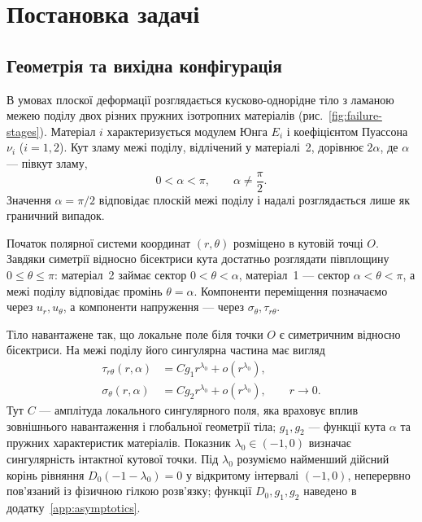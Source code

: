 \section{Постановка задачі}
\label{sec:problem}

\subsection{Геометрія та вихідна конфігурація}
\label{subsec:geometry}

В умовах плоскої деформації розглядається кусково-однорідне тіло з
ламаною межею поділу двох різних пружних ізотропних матеріалів
(рис.~\ref{fig:failure-stages}). Матеріал
$i$ характеризується модулем Юнга $E_i$ і коефіцієнтом Пуассона $\nu_i$
($i=1,2$). Кут зламу межі поділу, відлічений у матеріалі~2, дорівнює
$2\alpha$, де $\alpha$ --- півкут зламу,
\begin{equation*}
  0<\alpha<\pi, \qquad \alpha\ne\frac{\pi}{2}.
\end{equation*}
Значення $\alpha=\pi/2$ відповідає плоскій межі поділу і надалі
розглядається лише як граничний випадок.

Початок полярної системи координат $(r,\theta)$ розміщено в кутовій
точці $O$. Завдяки симетрії відносно бісектриси кута достатньо розглядати
півплощину $0\leq\theta\leq\pi$: матеріал~2 займає сектор
$0<\theta<\alpha$, матеріал~1 --- сектор $\alpha<\theta<\pi$, а межі
поділу відповідає промінь $\theta=\alpha$. Компоненти переміщення
позначаємо через $u_r,u_\theta$, а компоненти напруження --- через
$\sigma_\theta,\tau_{r\theta}$.

Тіло навантажене так, що локальне поле біля точки $O$ є симетричним
відносно бісектриси. На межі поділу його сингулярна частина має вигляд
\begin{equation*}
\begin{aligned}
  \tau_{r\theta}(r,\alpha)
    &= Cg_1 r^{\lambda_0}+o\!\left(r^{\lambda_0}\right),\\
  \sigma_\theta(r,\alpha)
    &= Cg_2 r^{\lambda_0}+o\!\left(r^{\lambda_0}\right),
    \qquad r\to0.
\end{aligned}
\end{equation*}
Тут $C$ --- амплітуда локального сингулярного поля, яка враховує
вплив зовнішнього навантаження і глобальної геометрії тіла;
$g_1,g_2$ --- функції кута $\alpha$ та пружних характеристик матеріалів.
Показник $\lambda_0\in(-1,0)$ визначає сингулярність інтактної кутової
точки. Під $\lambda_0$ розуміємо найменший дійсний корінь рівняння
$D_0(-1-\lambda_0)=0$ у відкритому інтервалі $(-1,0)$, неперервно
пов'язаний із фізичною гілкою розв'язку; функції $D_0,g_1,g_2$ наведено в
додатку~\ref{app:asymptotics}.

